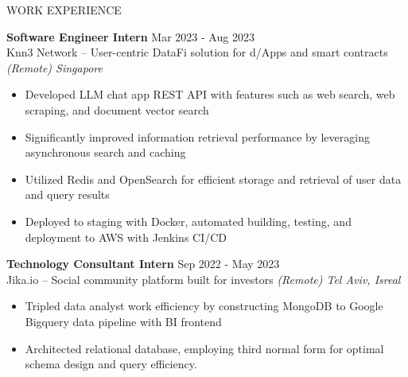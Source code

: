 \documentclass{resume} %
\begin{document}
\begin{rSection}{WORK EXPERIENCE}

	\textbf{Software Engineer Intern} \hfill Mar 2023 - Aug 2023\\
	Knn3 Network – User-centric DataFi solution for d/Apps and smart contracts  \hfill \textit{(Remote) Singapore}
	\begin{itemize}
		\item Developed LLM chat app REST API with features such as web search, web scraping, and document vector search
		\item Significantly improved information retrieval performance by leveraging asynchronous search and caching
		\item Utilized Redis and OpenSearch for efficient storage and retrieval of user data and query results
		\item Deployed to staging with Docker, automated building, testing, and deployment to AWS with Jenkins CI/CD
	\end{itemize}

	\textbf{Technology Consultant Intern} \hfill Sep 2022 - May 2023\\
	Jika.io – Social community platform built for investors \hfill \textit{(Remote) Tel Aviv, Isreal}
	\begin{itemize}
		\item Tripled data analyst work efficiency by constructing MongoDB to Google Bigquery data pipeline with BI frontend
		\item Architected relational database, employing third normal form for optimal schema design and query efficiency.
	\end{itemize}

\end{rSection}

\end{document}
